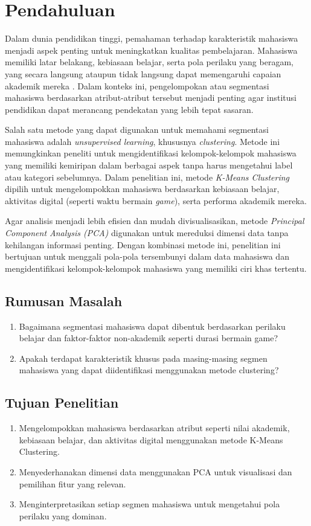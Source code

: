 \section{Pendahuluan}
Dalam dunia pendidikan tinggi, pemahaman terhadap karakteristik mahasiswa menjadi aspek penting untuk meningkatkan kualitas pembelajaran. Mahasiswa memiliki latar belakang, kebiasaan belajar, serta pola perilaku yang beragam, yang secara langsung ataupun tidak langsung dapat memengaruhi capaian akademik mereka \textcite{Aljaffer2024}. Dalam konteks ini, pengelompokan atau segmentasi mahasiswa berdasarkan atribut-atribut tersebut menjadi penting agar institusi pendidikan dapat merancang pendekatan yang lebih tepat sasaran.

Salah satu metode yang dapat digunakan untuk memahami segmentasi mahasiswa adalah \textit{unsupervised learning}, khususnya \textit{clustering}. Metode ini memungkinkan peneliti untuk mengidentifikasi kelompok-kelompok mahasiswa yang memiliki kemiripan dalam berbagai aspek tanpa harus mengetahui label atau kategori sebelumnya. Dalam penelitian ini, metode \textit{K-Means Clustering} dipilih untuk mengelompokkan mahasiswa berdasarkan kebiasaan belajar, aktivitas digital (seperti waktu bermain \textit{game}), serta performa akademik mereka.

Agar analisis menjadi lebih efisien dan mudah divisualisasikan, metode \textit{Principal Component Analysis (PCA)} digunakan untuk mereduksi dimensi data tanpa kehilangan informasi penting. Dengan kombinasi metode ini, penelitian ini bertujuan untuk menggali pola-pola tersembunyi dalam data mahasiswa dan mengidentifikasi kelompok-kelompok mahasiswa yang memiliki ciri khas tertentu.

\subsection{Rumusan Masalah}

\begin{enumerate}
    \item Bagaimana segmentasi mahasiswa dapat dibentuk berdasarkan perilaku belajar dan faktor-faktor non-akademik seperti durasi bermain game?
    \item Apakah terdapat karakteristik khusus pada masing-masing segmen mahasiswa yang dapat diidentifikasi menggunakan metode clustering?
\end{enumerate}

\subsection{Tujuan Penelitian}

\begin{enumerate}
    \item Mengelompokkan mahasiswa berdasarkan atribut seperti nilai akademik, kebiasaan belajar, dan aktivitas digital menggunakan metode K-Means Clustering.
    \item Menyederhanakan dimensi data menggunakan PCA untuk visualisasi dan pemilihan fitur yang relevan.
    \item Menginterpretasikan setiap segmen mahasiswa untuk mengetahui pola perilaku yang dominan.
\end{enumerate}
